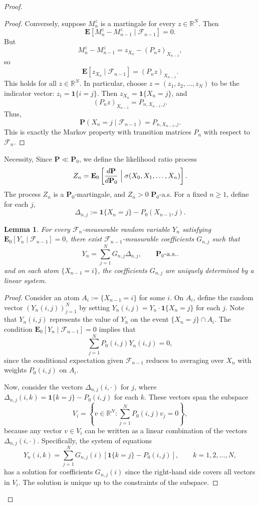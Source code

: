 \documentclass{lms}
\newtheorem{lemma}[theorem]{Lemma}     %
\begin{document}
\begin{proof}
\begin{proof}
    Conversely, suppose $M_n^z$ is a martingale for every $z \in \mathbb R^N$. Then
    $$\mathbf E[M_{n}^z - M_{n-1}^z \mid \mathscr F_{n-1}] = 0.$$
    But
    $$M_{n}^z - M_{n-1}^z = z_{X_{n}} - (P_{n} z)_{X_{n-1}},$$
    so
    $$\mathbf E[z_{X_{n}} \mid \mathscr F_{n-1}] = (P_{n} z)_{X_{n-1}}.$$
    This holds for all $z \in \mathbb R^N$. In particular, choose $z = (z_1,z_2,\dots,z_N)$ to be the indicator vector: $z_i = \mathbf 1{\{i=j\}}$. Then $z_{X_{n}} = \mathbf 1{\{X_{n} = j\}}$, and
    $$(P_{n} z)_{X_{n-1}} = P_{n, X_{n-1}, j}.$$
    Thus,
    $$\mathbf P(X_{n} = j \mid \mathscr F_{n-1}) = P_{n, X_{n-1}, j}.$$
    This is exactly the Markov property with transition matrices $P_n$ with respect to $\mathscr F_n$. \end{proof}


    Necessity, Since $\mathbf{P} \ll \mathbf{P}_0$, we define the likelihood ratio process
    $$Z_n = \mathbf E_0 \left[ \frac{d\mathbf{P}}{d\mathbf{P}_0} \Bigm| {\sigma(X_0, X_1, \dots, X_n)}\right].$$
    The process $Z_n$ is a $\mathbf{P}_0$-martingale, and $Z_n > 0$ $\mathbf{P}_0$-a.s. For a fixed \( n \ge 1 \), define for each \( j \),
    \[    \Delta_{n,j} := \mathbf{1}{\{X_n = j\}} - P_0(X_{n-1}, j).\]

    \begin{lemma}\label{lem: delta-basis} For every \( \mathscr{F}_n \)-measurable random variable \( Y_n \) satisfying \( \mathbf{E}_0[Y_n \mid \mathscr{F}_{n-1}] = 0 \), there exist \( \mathscr{F}_{n-1} \)-measurable coefficients \( G_{n,j} \) such that
    \[Y_n = \sum_{j=1}^N G_{n,j}\Delta_{n,j}, \qquad \mathbf{P}_0\text{-a.s.}.\]
    and on each atom \( \{X_{n-1} = i\} \), the coefficients \( G_{n,j} \) are uniquely determined by a linear system.
    \end{lemma}

\begin{proof}
Consider an atom \( A_i := \{X_{n-1} = i\} \) for some \( i\). On \( A_i \), define the random vector \( (Y_n(i,j))_{j=1}^N \) by setting \( Y_n(i,j) = Y_n \cdot \mathbf{1}{\{X_n = j\}} \) for each \( j \). Note that \( Y_n(i,j) \) represents the value of \( Y_n \) on the event \( \{X_n = j\} \cap A_i \). The condition \( \mathbf{E}_0[Y_n \mid \mathscr{F}_{n-1}] = 0 \) implies that
\[\sum_{j=1}^N  P_0(i,j) Y_n(i,j) = 0,\]
since the conditional expectation given \( \mathscr{F}_{n-1} \) reduces to averaging over \( X_n \) with weights \( P_0(i,j) \) on \( A_i \).

Now, consider the vectors \( \Delta_{n,j}(i, \cdot) \) for \(j\), where \( \Delta_{n,j}(i, k) = \mathbf{1}{\{k = j\}} - P_0(i,j) \) for each \(k\). These vectors span the subspace
\[V_i = \left\{ v \in \mathbb{R}^N : \sum_{j=1}^N  P_0(i,j) v_j = 0 \right\},\]
because any vector \( v \in V_i \) can be written as a linear combination of the vectors \( \Delta_{n,j}(i, \cdot) \). Specifically, the system of equations
\[Y_n(i, k) = \sum_{j=1}^N  G_{n,j}(i) \left[ \mathbf{1}{\{k = j\}} - P_0(i,j) \right], \qquad k = 1,2,\dots, N,\]
has a solution for coefficients \( G_{n,j}(i) \) since the right-hand side covers all vectors in \( V_i \). The solution is unique up to the constraints of the subspace.


\end{proof}
\end{proof}
\end{document}
